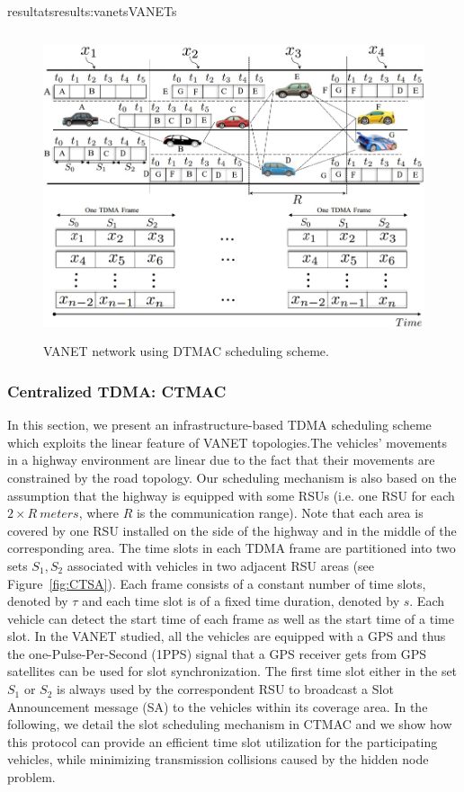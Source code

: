 \documentclass{ra2016}
\begin{document}
\begin{module}{resultats}{results:vanets}{VANETs}
\begin{figure}[!h]
  \begin{center}
 \includegraphics[height=9cm,width=15cm]{IMG/TRPM.jpg}
 
  \caption{VANET network using DTMAC scheduling scheme.}
 \label{figc:trpm}
  \end{center}
\end{figure}

\subsubsection{Centralized TDMA: CTMAC}

In this section, we present an infrastructure-based TDMA scheduling scheme which exploits the linear feature of VANET topologies.The 
vehicles' movements in a highway environment are linear due to the fact that their movements are constrained by the road topology. Our 
scheduling mechanism is also based on the assumption that the highway is equipped with some RSUs (i.e. one RSU 
for each $2\times R~meters$, where $R$ is the communication range). Note that each area is covered by one RSU installed on 
the side of the highway and in the middle of the corresponding area. The time slots in each TDMA 
frame are partitioned into two sets $S_1, S_2$ associated with vehicles in two adjacent RSU 
areas (see Figure~\ref{fig:CTSA}). Each frame consists of a constant number of time slots, denoted by $\tau$ and each time 
slot is of a fixed time duration, denoted by $s$. Each vehicle can detect the start time of each frame as well as the 
start time of a time slot. In the VANET studied, all the vehicles are equipped with a GPS 
and thus the one-Pulse-Per-Second (1PPS) signal that a GPS receiver gets from GPS satellites can be used for 
slot synchronization. The first time slot either in the set $S_1$ or $S_2$ is always used by the correspondent RSU to
broadcast a Slot Announcement message (SA) to the vehicles within its coverage area. In the following, we detail the slot scheduling mechanism in CTMAC and we show how this protocol can 
provide an efficient time slot utilization for the participating vehicles, while minimizing transmission collisions caused 
by the hidden node problem.


\end{module}
\end{document}
